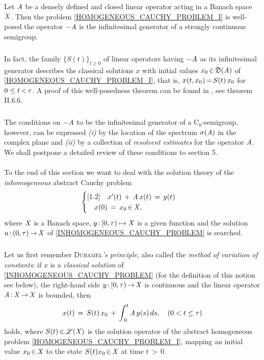 \documentclass[11pt,twoside]{article}
\begin{document}
\begin{theorem1}\label{WELL_POSEDNESS_THEOREM_I}
Let $\mathit{A}$ be a densely defined and closed linear operator
acting in a Banach space $\mathit{X}$.
Then the problem \eqref{HOMOGENEOUS_CAUCHY_PROBLEM_I} is well-posed
\iff
the operator ${-}\mathit{A}$ is the infinitesimal generator
of a strongly continuous semigroup.
\end{theorem1}

\subparagraph{}
In fact,
the family $\{S(t)\}_{t \geq 0}$ of linear operators
having ${-}\mathit{A}$ as its infinitesimal generator
describes the classical solutions $x$ with initial values
$x_0 {\,\in\,} \mathfrak{D}(\mathit{A})$ of \eqref{HOMOGENEOUS_CAUCHY_PROBLEM_I},
that is,
$x(t,x_0) {\,=\,} S(t)\,x_0$ for $0 \leq t {\,<\,} \tau$.
A proof of this well-posedness theorem can be found in \cite{EN},
see theorem II.6.6.

\subparagraph{}
The conditions on ${-}\mathit{A}$ to be the infinitesimal generator
of a C$_0$-semigroup,
however,
can be expressed 
\textit{(i)}  by the location of the spectrum $\sigma(\mathit{A})$
              in the complex plane and
\textit{(ii)} by a collection of \textit{resolvent estimates}
              for the operator $\mathit{A}$.
We shall postpone a detailed review of these conditions to section 5.

\paragraph{} %
To the end of this section we want to deal with the solution theory
of the \textit{inhomogeneous} abstract Cauchy problem
\begin{equation}\label{INHOMOGENEOUS_CAUCHY_PROBLEM}
\begin{cases}[1.2]
\quad  x'(t) \,+\, \mathit{A} \, x(t) \,=\, y(t)\\
\quad  x(0) \,=\, x_0 {\,\in\,} \mathit{X}, \\
\end{cases}
\end{equation}
where $\mathit{X}$ is a Banach space,
$y {\,:\,} [0,\tau) \mapsto \mathit{X}$ is a given function and
the solution $u {\,:\,} (0,\tau) {\,\to\,} \mathit{X}$ of \eqref{INHOMOGENEOUS_CAUCHY_PROBLEM}
is searched.

\subparagraph{} %
Let us first remember \textsc{Duhamel}\textit{'s principle},
also called the \textit{method of variation of constants}:
if $x$ is a \textit{classical solution} of \eqref{INHOMOGENEOUS_CAUCHY_PROBLEM}
(for the definition of this notion see below),
the right-hand side $y {\,:\,} [0,\tau) {\,\to\,} \mathit{X}$ is continuous
and the linear operator $\mathit{A} {\,:\,} \mathit{X} {\,\to\,} \mathit{X}$ is bounded,
then 
\[
x(t) \,=\, {S}(t) \, x_0 \,+\, \int_{\,0}^t \mathit{A} \, y(s) \, ds,
\quad (0 < t \leq \tau)
\]
holds,
where ${S}(t) {\,\in\,} \mathscr{L}(\mathit{X})$ is the solution operator
of the abstract homogeneous problem \eqref{HOMOGENEOUS_CAUCHY_PROBLEM_I},
mapping an initial value $x_0 {\,\in\,} \mathit{X}$
to the state ${S}(t)x_0 {\,\in\,} \mathit{X}$ at time $t {\,>\,} 0$.
\end{document}
